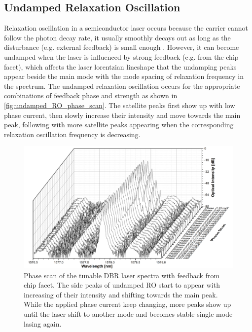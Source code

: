
\subsection{Undamped Relaxation Oscillation}\label{subsec:undamped_RO}
Relaxation oscillation in a semiconductor laser occurs because the carrier cannot follow the photon decay rate, it usually smoothly decays out as long as the disturbance (e.g. external feedback) is small enough \cite{ohtsubo2012semiconductor}. However, it can become undamped when the laser is influenced by strong feedback (e.g. from the chip facet), which affects the laser lorentzian lineshape that the undamping peaks appear beside the main mode with the mode spacing of relaxation frequency in the spectrum. The undamped relaxation oscillation occurs for the appropriate combinations of feedback phase and strength as shown in \autoref{fig:undamped_RO_phase_scan}. The satellite peaks first show up with low phase current, then slowly increase their intensity and move towards the main peak, following with more satellite peaks appearing when the corresponding relaxation oscillation frequency is decreasing.

\begin{figure}[ht]
    \centering
    \includegraphics[width=.8\linewidth]{figures/Undamped_RO_phase_scan_grating_4621.png}
    \caption{Phase scan of the tunable DBR laser spectra with feedback from chip facet. The side peaks of undamped RO start to appear with increasing of their intensity and shifting towards the main peak. While the applied phase current keep changing, more peaks show up until the laser shift to another mode and becomes stable single mode lasing again.}
    \label{fig:undamped_RO_phase_scan}
\end{figure}

